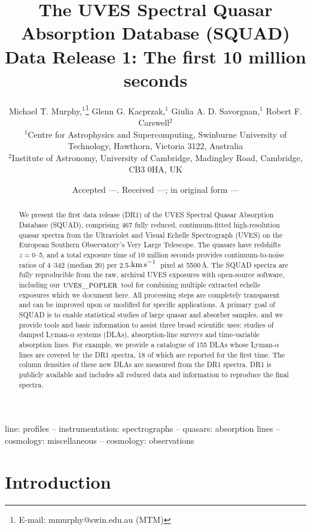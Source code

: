 \documentclass[fleqn,usenatbib,usedcolumn]{mnras}
\title[UVES SQUAD Data Release 1]{The UVES Spectral Quasar Absorption Database (SQUAD) Data Release 1: The first 10 million seconds}
\author[M. T. Murphy et al.]{Michael T. Murphy,$^{1}$\thanks{E-mail: mmurphy@swin.edu.au (MTM)} Glenn G. Kacprzak,$^{1}$ Giulia A. D. Savorgnan,$^{1}$\newauthor
Robert F. Carswell$^{2}$\\
  $^{1}$Centre for Astrophysics and Supercomputing, Swinburne University of Technology, Hawthorn, Victoria 3122, Australia\\
  $^{2}$Institute of Astronomy, University of Cambridge, Madingley Road, Cambridge, CB3 0HA, UK
}
\date{Accepted ---. Received ---; in original form ---}
\newcommand{\kms}{\ensuremath{\textrm{km\,s}^{-1}}}
\newcommand{\popler}{\ensuremath{\textsc{uves\_popler}}}
\begin{document}
\label{firstpage}
\pagerange{\pageref{firstpage}--\pageref{lastpage}}
\maketitle

\begin{abstract}
We present the first data release (DR1) of the UVES Spectral Quasar Absorption Database (SQUAD), comprising 467 fully reduced, continuum-fitted high-resolution quasar spectra from the Ultraviolet and Visual Echelle Spectrograph (UVES) on the European Southern Observatory's Very Large Telescope. The quasars have redshifts $z=0$--5, and a total exposure time of 10 million seconds provides continuum-to-noise ratios of 4--342 (median 20) per 2.5-\kms\ pixel at 5500\,\AA. The SQUAD spectra are fully reproducible from the raw, archival UVES exposures with open-source software, including our \popler\ tool for combining multiple extracted echelle exposures which we document here. All processing steps are completely transparent and can be improved upon or modified for specific applications. A primary goal of SQUAD is to enable statistical studies of large quasar and absorber samples, and we provide tools and basic information to assist three broad scientific uses: studies of damped Lyman-$\alpha$ systems (DLAs), absorption-line surveys and time-variable absorption lines. For example, we provide a catalogue of 155 DLAs whose Lyman-$\alpha$ lines are covered by the DR1 spectra, 18 of which are reported for the first time. The  column densities of these new DLAs are measured from the DR1 spectra. DR1 is publicly available and includes all reduced data and information to reproduce the final spectra.
\end{abstract}

\begin{keywords}
line: profiles -- instrumentation: spectrographs -- quasars: absorption lines -- cosmology: miscellaneous -- cosmology: observations
\end{keywords}



\section{Introduction}\label{s:intro}
\end{document}
